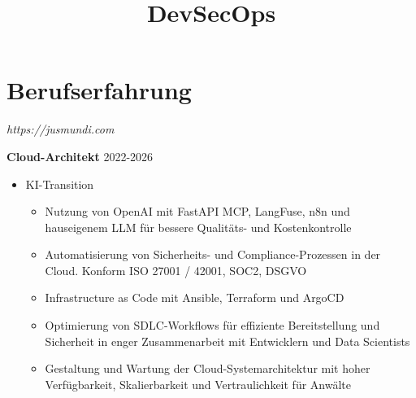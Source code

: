 \documentclass[11pt,a4paper]{moderncv}
\title{DevSecOps}
\begin{document}
\makecvtitle

\section{Berufserfahrung}

{
\textit{https://jusmundi.com}
\bigskip

\textbf{Cloud-Architekt} \hfill 2022-2026
	\begin{itemize}%
		\item KI-Transition
			\begin{itemize}%
				\item Nutzung von OpenAI mit FastAPI MCP, LangFuse, n8n und hauseigenem LLM für bessere Qualitäts- und Kostenkontrolle
				\item Automatisierung von Sicherheits- und Compliance-Prozessen in der Cloud. Konform ISO 27001 / 42001, SOC2, DSGVO
				\item Infrastructure as Code mit Ansible, Terraform und ArgoCD
				\item Optimierung von SDLC-Workflows für effiziente Bereitstellung und Sicherheit in enger Zusammenarbeit mit Entwicklern und Data Scientists
				\item Gestaltung und Wartung der Cloud-Systemarchitektur mit hoher Verfügbarkeit, Skalierbarkeit und Vertraulichkeit für Anwälte
			\end{itemize}
	\end{itemize}
}
\bigskip
{}
\end{document}
